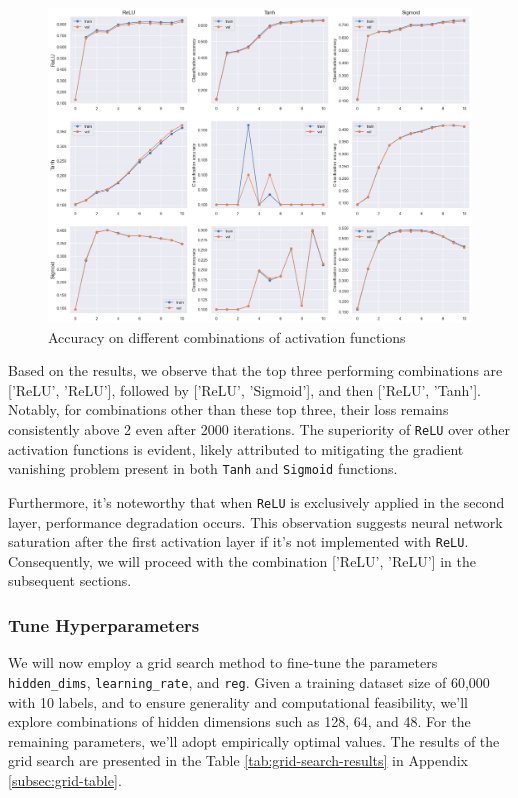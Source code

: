 \documentclass[10pt,a4paper,twoside]{tau}
\begin{document}
\begin{figure}[htbp]
    \centering
    \includegraphics[scale=0.21]{images/activation_acc.png}
    \caption{Accuracy on different combinations of activation functions}
    \label{fig:activation-acc}
\end{figure}

Based on the results, we observe that the top three performing combinations are ['ReLU', 'ReLU'], followed by ['ReLU', 'Sigmoid'], and then ['ReLU', 'Tanh']. Notably, for combinations other than these top three, their loss remains consistently above 2 even after 2000 iterations. The superiority of \texttt{ReLU} over other activation functions is evident, likely attributed to mitigating the gradient vanishing problem present in both \texttt{Tanh} and \texttt{Sigmoid} functions.

Furthermore, it's noteworthy that when \texttt{ReLU} is exclusively applied in the second layer, performance degradation occurs. This observation suggests neural network saturation after the first activation layer if it's not implemented with \texttt{ReLU}. Consequently, we will proceed with the combination ['ReLU', 'ReLU'] in the subsequent sections.


\subsubsection{Tune Hyperparameters}

We will now employ a grid search method to fine-tune the parameters \texttt{hidden\_dims}, \texttt{learning\_rate}, and \texttt{reg}. Given a training dataset size of 60,000 with 10 labels, and to ensure generality and computational feasibility, we'll explore combinations of hidden dimensions such as 128, 64, and 48. For the remaining parameters, we'll adopt empirically optimal values. The results of the grid search are presented in the Table \ref{tab:grid-search-results} in Appendix \ref{subsec:grid-table}.
\end{document}
